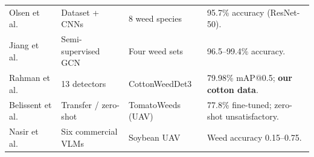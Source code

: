 \begin{small}
\begin{longtable}{@{}L{2.5cm}L{3.4cm}L{3.4cm}L{4.6cm}@{}}
Olsen et al.~\cite{olsen2019deepweeds} & Dataset + CNNs & 8 weed species & 95.7\% accuracy (ResNet-50).\\
Jiang et al.~\cite{jiang2020gcn} & Semi-supervised GCN & Four weed sets & 96.5--99.4\% accuracy.\\
Rahman et al.~\cite{rahman2023cotton} & 13 detectors & CottonWeedDet3 & 79.98\% mAP@0.5; \textbf{our cotton data}.\\
Belissent et al.~\cite{belissent2024transfer} & Transfer / zero-shot & TomatoWeeds (UAV) & 77.8\% fine-tuned; zero-shot unsatisfactory.\\
Nasir et al.~\cite{nasir2026vlmweed} & Six commercial VLMs & Soybean UAV & Weed accuracy 0.15--0.75.\\
\bottomrule
\end{longtable}
\end{small}
